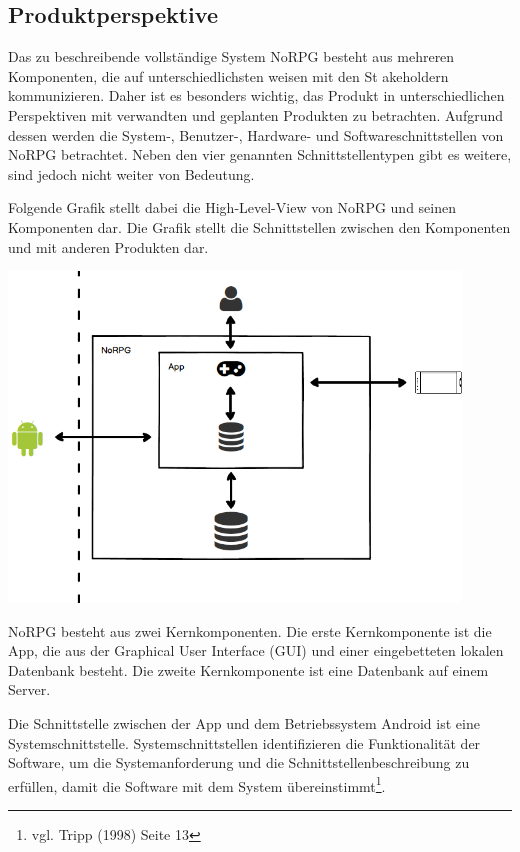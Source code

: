 	\subsection{Produktperspektive}
		Das zu beschreibende vollständige System NoRPG besteht aus mehreren Komponenten, die auf unterschiedlichsten weisen mit den St akeholdern kommunizieren. Daher ist es besonders wichtig, das Produkt in unterschiedlichen Perspektiven mit verwandten und geplanten Produkten zu betrachten. Aufgrund dessen werden die System-, Benutzer-, Hardware- und Softwareschnittstellen von NoRPG betrachtet. Neben den vier genannten Schnittstellentypen gibt es weitere, sind jedoch nicht weiter von Bedeutung.
		
		Folgende Grafik stellt dabei die High-Level-View von NoRPG und seinen Komponenten dar. Die Grafik stellt die Schnittstellen zwischen den Komponenten und mit anderen Produkten dar.
		
		\begin{center}
			\includegraphics[width=12cm]{pics/HighLevelView.png}
		\end{center}
		
		NoRPG besteht aus zwei Kernkomponenten. Die erste Kernkomponente ist die App, die aus der Graphical User Interface (GUI) und einer eingebetteten lokalen Datenbank besteht. Die zweite Kernkomponente ist eine Datenbank auf einem Server.
		
		Die Schnittstelle zwischen der App und dem Betriebssystem Android ist eine Systemschnittstelle. Systemschnittstellen identifizieren die Funktionalität der Software, um die Systemanforderung und die Schnittstellenbeschreibung zu erfüllen, damit die Software mit dem System übereinstimmt\footnote{vgl. Tripp \cite{srsIEEE}(1998) Seite 13}.
		

